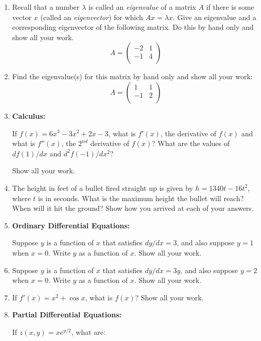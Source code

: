 \documentclass[11pt]{article}
\begin{document}
\begin{enumerate}
\item
Recall that a number $\lambda$ is called an {\em eigenvalue} of a matrix $A$ if there is some vector $x$ (called an {\em eigenvector}) for which $Ax = \lambda x$.
Give an eigenvalue and a corresponding eigenvector of the following matrix. Do this by hand only and show all your work.
$$ A = \left(
\begin{array}{cc}
-2 & 1 \\   
-1 & 4 \\
\end{array} 
\right) $$

\item 
Find the eigenvalue(s) for this matrix by hand only and show all your work:
$$ A = \left(
\begin{array}{cc}
1 & 1 \\    
-1 & 2 \\
\end{array} 
\right)$$


\item
\textbf{Calculus:}

If $f(x)=6x^3-3x^2+2x-3$, what is $f'(x)$, the derivative of $f(x)$ and what is $f''(x)$, the $2^{nd}$ derivative of $f(x)$?
What are the values of $df(1)/dx$ and $d^2f(-1)/dx^2$?

Show all your work.

\item
The height in feet of a bullet fired straight up is
given by $h=1340t-16t^2$, where $t$ is in seconds.
What is the maximum height the bullet will reach? 
When will it hit the ground? Show how you arrived at each of your answers.

\item
\textbf{Ordinary Differential Equations:}

Suppose $y$ is a function of $x$ that satisfies
$dy/dx = 3$, and also suppose $y=1$ when $x=0$.
Write $y$ as a function of $x$. Show all your work.


\item 
Suppose $y$ is a function of $x$ that satisfies
$dy/dx = 3y$, and also suppose $y=2$ when $x=0$.
Write $y$ as a function of $x$. Show all your work.


\item
If $f'(x) = x^2 + \cos x$, what is $f(x)$? 
Show all your work.

\item
\textbf{Partial Differential Equations:}

If $z(x,y) = xe^{y/2}$, what are:


\end{enumerate}
\end{document}
